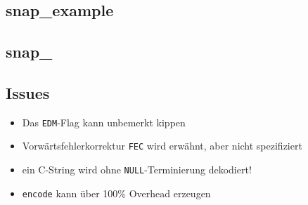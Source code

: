 \subsection{snap_example}
\begin{frame}[fragile]

\end{frame}


\subsection{snap\_\ast}
\begin{frame}[fragile]

\end{frame}

\subsection{Issues}
\begin{frame}[fragile]
  \begin{itemize}
    \item<1->Das \texttt{EDM}-Flag kann unbemerkt kippen
    \item<2->Vorw\"artsfehlerkorrektur \texttt{FEC} wird erw\"ahnt, aber nicht spezifiziert
    \item<3->ein C-String wird ohne \texttt{NULL}-Terminierung dekodiert!
    \item<4->\texttt{encode} kann \"uber 100\% Overhead erzeugen
  \end{itemize}
\end{frame}
